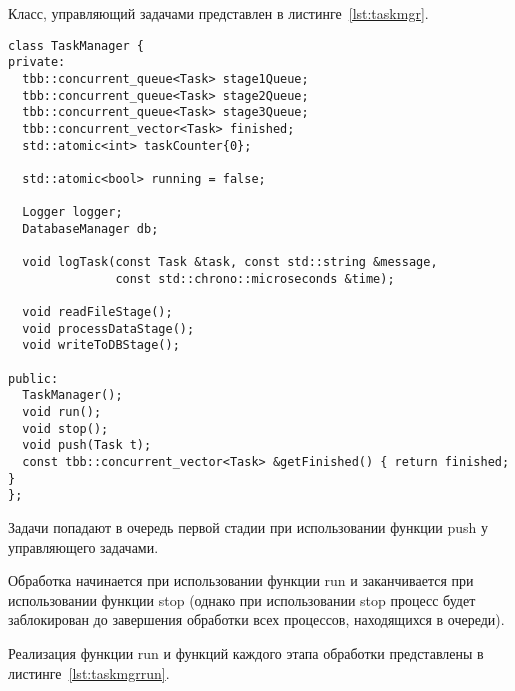 Класс, управляющий задачами представлен в листинге~\ref{lst:taskmgr}.

\begin{lstlisting}[caption={Класс, управляющий задачами},label={lst:taskmgr}]
class TaskManager {
private:
  tbb::concurrent_queue<Task> stage1Queue;
  tbb::concurrent_queue<Task> stage2Queue;
  tbb::concurrent_queue<Task> stage3Queue;
  tbb::concurrent_vector<Task> finished;
  std::atomic<int> taskCounter{0};

  std::atomic<bool> running = false;

  Logger logger;
  DatabaseManager db;

  void logTask(const Task &task, const std::string &message,
               const std::chrono::microseconds &time);

  void readFileStage();
  void processDataStage();
  void writeToDBStage();

public:
  TaskManager();
  void run();
  void stop();
  void push(Task t);
  const tbb::concurrent_vector<Task> &getFinished() { return finished; }
};
\end{lstlisting}

Задачи попадают в очередь первой стадии при использовании функции push у управляющего задачами.

Обработка начинается при использовании функции run и заканчивается при использовании функции stop (однако при использовании stop процесс будет заблокирован до завершения обработки всех процессов, находящихся в очереди).

Реализация функции run и функций каждого этапа обработки представлены в листинге~\ref{lst:taskmgrrun}.

